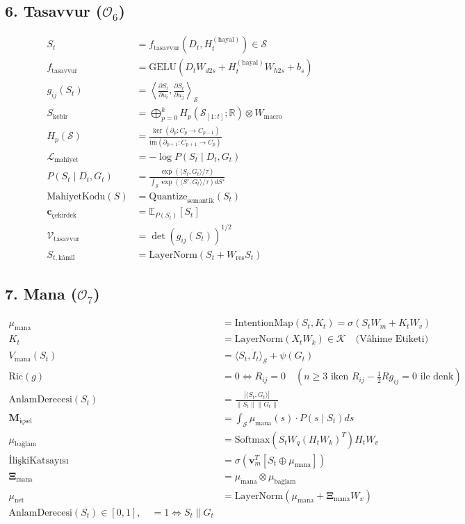 \documentclass[11pt, a4paper]{article}
\begin{document}
\subsection{6. Tasavvur ($\mathcal{O}_6$)}
\begin{align}
S_t &= f_{\text{tasavvur}}(D_t, H_t^{(\text{hayal})}) \in \mathcal{S} \\
f_{\text{tasavvur}} &= \text{GELU}(D_t W_{d2s} + H_t^{(\text{hayal})} W_{h2s} + b_s) \\
g_{ij}(S_t) &= \left\langle \frac{\partial S_t}{\partial u_i}, \frac{\partial S_t}{\partial u_j} \right\rangle_{\mathcal{S}} \\
S_{\text{kebîr}} &= \bigoplus_{p=0}^k H_p\left(\mathcal{S}_{[1:t]}; \mathbb{R}\right) \otimes W_{\text{macro}} \\
H_p(\mathcal{S}) &= \frac{\ker(\partial_p: C_p \to C_{p-1})}{\text{im}(\partial_{p+1}: C_{p+1} \to C_p)} \\
\mathcal{L}_{\text{mahiyet}} &= -\log P(S_t \mid D_t, G_t) \\
P(S_t \mid D_t, G_t) &= \frac{\exp(\langle S_t, G_t \rangle / \tau)}{\int_{\mathcal{S}} \exp(\langle S', G_t \rangle / \tau) dS'} \\
\text{MahiyetKodu}(S) &= \text{Quantize}_{\text{semantik}}(S_t) \\
\mathbf{c}_{\text{çekirdek}} &= \mathbb{E}_{P(S_t)}[S_t] \\
\mathcal{V}_{\text{tasavvur}} &= \det(g_{ij}(S_t))^{1/2} \\
S_{t, \text{kâmil}} &= \text{LayerNorm}(S_t + W_{\text{res}} S_t)
\end{align}

\subsection{7. Mana ($\mathcal{O}_7$)}
\begin{align}
\mu_{\text{mana}} &= \text{IntentionMap}(S_t, K_t) = \sigma(S_t W_m + K_t W_v) \\
K_t &= \text{LayerNorm}(X_t W_k) \in \mathcal{K} \quad \text{(Vâhime Etiketi)} \\
V_{\text{mana}}(S_t) &= \langle S_t, \dot{I}_t \rangle_{\mathcal{S}} + \psi(G_t) \\
\text{Ric}(g) &= 0 \iff R_{ij} = 0 \quad (n \ge 3 \text{ iken } R_{ij} - \tfrac{1}{2}R g_{ij} = 0 \text{ ile denk}) \\
\text{AnlamDerecesi}(S_t) &= \frac{|\langle S_t, G_t \rangle|}{\|S_t\| \|G_t\|} \\
\mathbf{M}_{\text{içsel}} &= \int_{\mathcal{S}} \mu_{\text{mana}}(s) \cdot P(s \mid S_t) ds \\
\mu_{\text{bağlam}} &= \text{Softmax}(S_t W_q (H_t W_k)^T) H_t W_v \\
\text{İlişkiKatsayısı} &= \sigma(\mathbf{v}_m^T [S_t \oplus \mu_{\text{mana}}]) \\
\mathbf{\Xi}_{\text{mana}} &= \mu_{\text{mana}} \otimes \mu_{\text{bağlam}} \\
\mu_{\text{net}} &= \text{LayerNorm}(\mu_{\text{mana}} + \mathbf{\Xi}_{\text{mana}} W_x) \\
\text{AnlamDerecesi}(S_t) \in [0,1], \quad = 1 \iff S_t \parallel G_t
\end{align}
\end{document}
